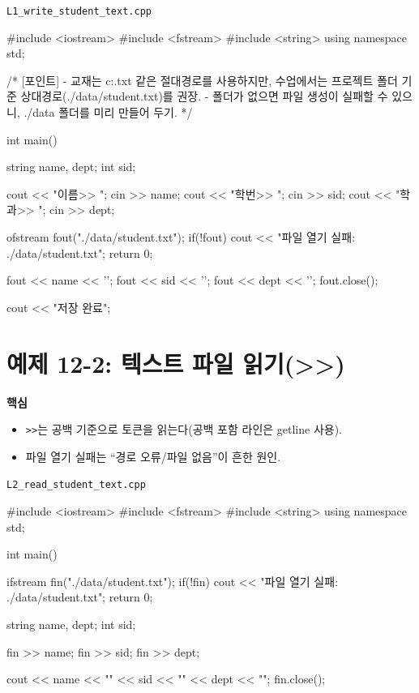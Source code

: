 \documentclass[11pt,a4paper]{article}
\newcommand{\filetag}[1]{\texttt{\color{Accent}#1}}
\begin{document}
\noindent\filetag{L1\_write\_student\_text.cpp}
\begin{cppcode}
#include <iostream>
#include <fstream>
#include <string>
using namespace std;

/*
[포인트]
- 교재는 c:\temp\student.txt 같은 절대경로를 사용하지만,
  수업에서는 프로젝트 폴더 기준 상대경로(./data/student.txt)를 권장.
- 폴더가 없으면 파일 생성이 실패할 수 있으니, ./data 폴더를 미리 만들어 두기.
*/

int main() {
    string name, dept;
    int sid;

    cout << "이름>> ";
    cin >> name;
    cout << "학번>> ";
    cin >> sid;
    cout << "학과>> ";
    cin >> dept;

    ofstream fout("./data/student.txt");
    if(!fout) {
        cout << "파일 열기 실패: ./data/student.txt\n";
        return 0;
    }

    fout << name << '\n';
    fout << sid  << '\n';
    fout << dept << '\n';
    fout.close();

    cout << "저장 완료\n";
}
\end{cppcode}

\section{예제 12-2: 텍스트 파일 읽기(>>)}
\begin{GoalBox}
\textbf{핵심}
\begin{itemize}[leftmargin=18pt]
  \item \texttt{>>}는 공백 기준으로 토큰을 읽는다(공백 포함 라인은 getline 사용). %
  \item 파일 열기 실패는 ``경로 오류/파일 없음''이 흔한 원인. %
\end{itemize}
\end{GoalBox}

\noindent\filetag{L2\_read\_student\_text.cpp}
\begin{cppcode}
#include <iostream>
#include <fstream>
#include <string>
using namespace std;

int main() {
    ifstream fin("./data/student.txt");
    if(!fin) {
        cout << "파일 열기 실패: ./data/student.txt\n";
        return 0;
    }

    string name, dept;
    int sid;

    fin >> name;
    fin >> sid;
    fin >> dept;

    cout << name << "\n" << sid << "\n" << dept << "\n";
    fin.close();
}
\end{cppcode}
\end{document}
